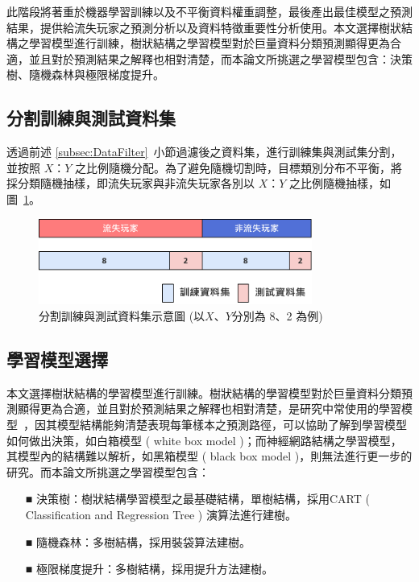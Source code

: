 此階段將著重於機器學習訓練以及不平衡資料權重調整，最後產出最佳模型之預測結果，提供給流失玩家之預測分析以及資料特徵重要性分析使用。本文選擇樹狀結構之學習模型進行訓練，樹狀結構之學習模型對於巨量資料分類預測顯得更為合適，並且對於預測結果之解釋也相對清楚，而本論文所挑選之學習模型包含：決策樹、隨機森林與極限梯度提升。

\subsection{分割訓練與測試資料集}
\label{subsec:SplitDataset}

透過前述 \ref{subsec:DataFilter}~小節過濾後之資料集，進行訓練集與測試集分割，並按照 $X$：$Y$ 之比例隨機分配。為了避免隨機切割時，目標類別分布不平衡，將採分類隨機抽樣，即流失玩家與非流失玩家各別以 $X$：$Y$ 之比例隨機抽樣，如圖~\ref{fig:Image_SplitDataset}。

\begin{figure}[!htb]
  \begin{center}
    \includegraphics[width=0.8\textwidth]{figures/Image_SplitDataset.png}
    \caption[分割訓練與測試資料集示意圖]{分割訓練與測試資料集示意圖 (以$X$、$Y$分別為 8、2 為例) }
    \label{fig:Image_SplitDataset}
  \end{center}
\end{figure}

\subsection{學習模型選擇}
\label{subsec:ModelSelection}

本文選擇樹狀結構的學習模型進行訓練。樹狀結構的學習模型對於巨量資料分類預測顯得更為合適，並且對於預測結果之解釋也相對清楚，是研究中常使用的學習模型~\cite{wu2008top}，因其模型結構能夠清楚表現每筆樣本之預測路徑，可以協助了解到學習模型如何做出決策，如白箱模型 ( white box model )；而神經網路結構之學習模型，其模型內的結構難以解析，如黑箱模型 ( black box model )，則無法進行更一步的研究。而本論文所挑選之學習模型包含：
\newpage

\begin{itemize}
  \item [■] 決策樹：樹狀結構學習模型之最基礎結構，單樹結構，採用CART ( Classification and Regression Tree ) 演算法進行建樹。
  \item [■] 隨機森林：多樹結構，採用裝袋算法建樹。
  \item [■] 極限梯度提升：多樹結構，採用提升方法建樹。
\end{itemize}

